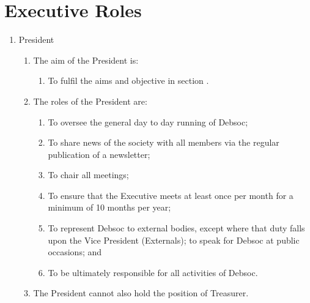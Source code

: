 \newpage
\section{Executive Roles}
\begin{enumerate}
\item President
  \begin{enumerate}
  \item The aim of the President is:
    \begin{enumerate}
    \item To fulfil the aims and objective in section .
    \end{enumerate}
  \item The roles of the President are:
    \begin{enumerate}
    \item To oversee the general day to day running of Debsoc;
    \item To share news of the society with all members via the regular publication of a newsletter;
    \item To chair all meetings;
    \item To ensure that the Executive meets at least once per month for a minimum of 10 months per year;
    \item To represent Debsoc to external bodies, except where that duty falls upon the Vice President (Externals); to speak for Debsoc at public occasions; and
    \item To be ultimately responsible for all activities of Debsoc.
    \end{enumerate}
  \item The President cannot also hold the position of Treasurer.
  \end{enumerate}


\end{enumerate}
